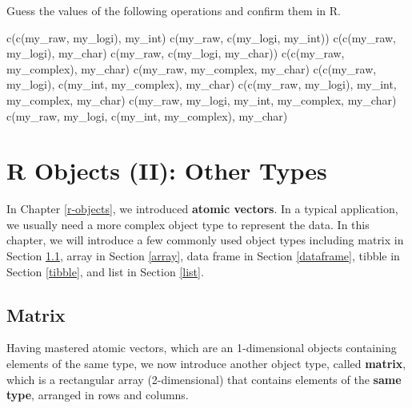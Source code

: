 \documentclass[
]{book}
\newenvironment{Shaded}{\begin{snugshade}}{\end{snugshade}}
\newcommand{\FunctionTok}[1]{\textcolor[rgb]{0.00,0.00,0.00}{#1}}
\newcommand{\NormalTok}[1]{#1}
\begin{document}
Guess the values of the following operations and confirm them in R.

\begin{Shaded}
\begin{Highlighting}[]
\FunctionTok{c}\NormalTok{(}\FunctionTok{c}\NormalTok{(my\_raw, my\_logi), my\_int)}
\FunctionTok{c}\NormalTok{(my\_raw, }\FunctionTok{c}\NormalTok{(my\_logi, my\_int))}
\FunctionTok{c}\NormalTok{(}\FunctionTok{c}\NormalTok{(my\_raw, my\_logi), my\_char)}
\FunctionTok{c}\NormalTok{(my\_raw, }\FunctionTok{c}\NormalTok{(my\_logi, my\_char))}
\FunctionTok{c}\NormalTok{(}\FunctionTok{c}\NormalTok{(my\_raw, my\_complex), my\_char)}
\FunctionTok{c}\NormalTok{(my\_raw, my\_complex, my\_char)}
\FunctionTok{c}\NormalTok{(}\FunctionTok{c}\NormalTok{(my\_raw, my\_logi), }\FunctionTok{c}\NormalTok{(my\_int, my\_complex), my\_char)}
\FunctionTok{c}\NormalTok{(}\FunctionTok{c}\NormalTok{(my\_raw, my\_logi), my\_int, my\_complex, my\_char)}
\FunctionTok{c}\NormalTok{(my\_raw, my\_logi, my\_int, my\_complex, my\_char)}
\FunctionTok{c}\NormalTok{(my\_raw, my\_logi, }\FunctionTok{c}\NormalTok{(my\_int, my\_complex), my\_char)}
\end{Highlighting}
\end{Shaded}

\hypertarget{object-other-type}{%
\chapter{R Objects (II): Other Types}\label{object-other-type}}

In Chapter \ref{r-objects}, we introduced \textbf{atomic vectors}. In a typical application, we usually need a more complex object type to represent the data. In this chapter, we will introduce a few commonly used object types including matrix in Section \ref{matrix}, array in Section \ref{array}, data frame in Section \ref{dataframe}, tibble in Section \ref{tibble}, and list in Section \ref{list}.

\hypertarget{matrix}{%
\section{Matrix}\label{matrix}}

Having mastered atomic vectors, which are an 1-dimensional objects containing elements of the same type, we now introduce another object type, called \textbf{matrix}, which is a rectangular array (2-dimensional) that contains elements of the \textbf{same type}, arranged in rows and columns.
\end{document}
